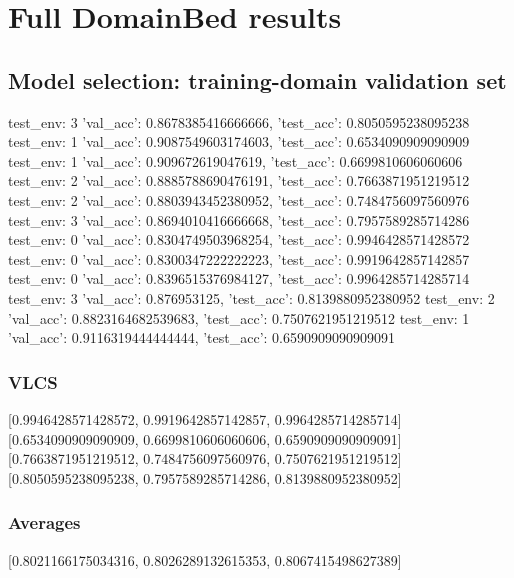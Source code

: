 \documentclass{article}
\begin{document}
\section{Full DomainBed results}

\subsection{Model selection: training-domain validation set}
test_env: 3
{'val_acc': 0.8678385416666666, 'test_acc': 0.8050595238095238}
test_env: 1
{'val_acc': 0.9087549603174603, 'test_acc': 0.6534090909090909}
test_env: 1
{'val_acc': 0.909672619047619, 'test_acc': 0.6699810606060606}
test_env: 2
{'val_acc': 0.8885788690476191, 'test_acc': 0.7663871951219512}
test_env: 2
{'val_acc': 0.8803943452380952, 'test_acc': 0.7484756097560976}
test_env: 3
{'val_acc': 0.8694010416666668, 'test_acc': 0.7957589285714286}
test_env: 0
{'val_acc': 0.8304749503968254, 'test_acc': 0.9946428571428572}
test_env: 0
{'val_acc': 0.8300347222222223, 'test_acc': 0.9919642857142857}
test_env: 0
{'val_acc': 0.8396515376984127, 'test_acc': 0.9964285714285714}
test_env: 3
{'val_acc': 0.876953125, 'test_acc': 0.8139880952380952}
test_env: 2
{'val_acc': 0.8823164682539683, 'test_acc': 0.7507621951219512}
test_env: 1
{'val_acc': 0.9116319444444444, 'test_acc': 0.6590909090909091}

\subsubsection{VLCS}
[0.9946428571428572, 0.9919642857142857, 0.9964285714285714]
[0.6534090909090909, 0.6699810606060606, 0.6590909090909091]
[0.7663871951219512, 0.7484756097560976, 0.7507621951219512]
[0.8050595238095238, 0.7957589285714286, 0.8139880952380952]

\begin{center}
\end{center}

\subsubsection{Averages}
[0.8021166175034316, 0.8026289132615353, 0.8067415498627389]

\begin{center}
\end{center}
\end{document}
